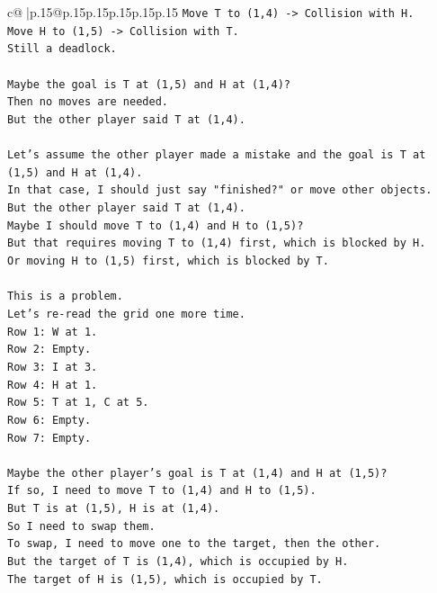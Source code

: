 \documentclass{article}
\begin{document}
{\begin{supertabular}{c@{$\;$}|p{.15\linewidth}@{}p{.15\linewidth}p{.15\linewidth}p{.15\linewidth}p{.15\linewidth}p{.15\linewidth}}
{{{\texttt{Move T to (1,4) {-}> Collision with H.} \\
\texttt{Move H to (1,5) {-}> Collision with T.} \\
\texttt{Still a deadlock.} \\
\\ 
\texttt{Maybe the goal is T at (1,5) and H at (1,4)?} \\
\texttt{Then no moves are needed.} \\
\texttt{But the other player said T at (1,4).} \\
\\ 
\texttt{Let's assume the other player made a mistake and the goal is T at (1,5) and H at (1,4).} \\
\texttt{In that case, I should just say "finished?" or move other objects.} \\
\texttt{But the other player said T at (1,4).} \\
\texttt{Maybe I should move T to (1,4) and H to (1,5)?} \\
\texttt{But that requires moving T to (1,4) first, which is blocked by H.} \\
\texttt{Or moving H to (1,5) first, which is blocked by T.} \\
\\ 
\texttt{This is a problem.} \\
\texttt{Let's re{-}read the grid one more time.} \\
\texttt{Row 1: W at 1.} \\
\texttt{Row 2: Empty.} \\
\texttt{Row 3: I at 3.} \\
\texttt{Row 4: H at 1.} \\
\texttt{Row 5: T at 1, C at 5.} \\
\texttt{Row 6: Empty.} \\
\texttt{Row 7: Empty.} \\
\\ 
\texttt{Maybe the other player's goal is T at (1,4) and H at (1,5)?} \\
\texttt{If so, I need to move T to (1,4) and H to (1,5).} \\
\texttt{But T is at (1,5), H is at (1,4).} \\
\texttt{So I need to swap them.} \\
\texttt{To swap, I need to move one to the target, then the other.} \\
\texttt{But the target of T is (1,4), which is occupied by H.} \\
\texttt{The target of H is (1,5), which is occupied by T.} \\
}}}
\end{supertabular}}
\end{document}
